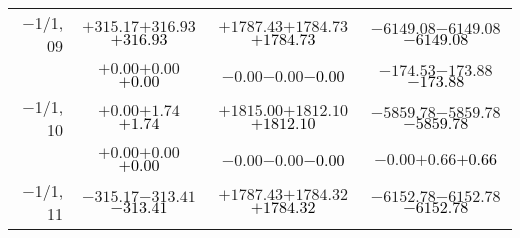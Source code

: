 \documentclass[compress]{beamer}
\begin{document}
\begin{frame}
{\begin{tabular}{r | c | c | c}
$-$1/1, 09 & $+315.17$\hspace{0.1 cm}$+316.93$\hspace{0.1 cm}\textcolor{black}{$+316.93$} & $+1787.43$\hspace{0.1 cm}$+1784.73$\hspace{0.1 cm}\textcolor{black}{$+1784.73$} & $-6149.08$\hspace{0.1 cm}$-6149.08$\hspace{0.1 cm}\textcolor{black}{$-6149.08$} \\
           & $+0.00$\hspace{0.1 cm}$+0.00$\hspace{0.1 cm}\textcolor{black}{$+0.00$} & $-0.00$\hspace{0.1 cm}$-0.00$\hspace{0.1 cm}\textcolor{black}{$-0.00$} & $-174.53$\hspace{0.1 cm}$-173.88$\hspace{0.1 cm}\textcolor{black}{$-173.88$} \\
$-$1/1, 10 & $+0.00$\hspace{0.1 cm}$+1.74$\hspace{0.1 cm}\textcolor{black}{$+1.74$} & $+1815.00$\hspace{0.1 cm}$+1812.10$\hspace{0.1 cm}\textcolor{black}{$+1812.10$} & $-5859.78$\hspace{0.1 cm}$-5859.78$\hspace{0.1 cm}\textcolor{black}{$-5859.78$} \\
           & $+0.00$\hspace{0.1 cm}$+0.00$\hspace{0.1 cm}\textcolor{black}{$+0.00$} & $-0.00$\hspace{0.1 cm}$-0.00$\hspace{0.1 cm}\textcolor{black}{$-0.00$} & $-0.00$\hspace{0.1 cm}$+0.66$\hspace{0.1 cm}\textcolor{black}{$+0.66$} \\
$-$1/1, 11 & $-315.17$\hspace{0.1 cm}$-313.41$\hspace{0.1 cm}\textcolor{black}{$-313.41$} & $+1787.43$\hspace{0.1 cm}$+1784.32$\hspace{0.1 cm}\textcolor{black}{$+1784.32$} & $-6152.78$\hspace{0.1 cm}$-6152.78$\hspace{0.1 cm}\textcolor{black}{$-6152.78$} \\

\end{tabular}}
\end{frame}
\end{document}
